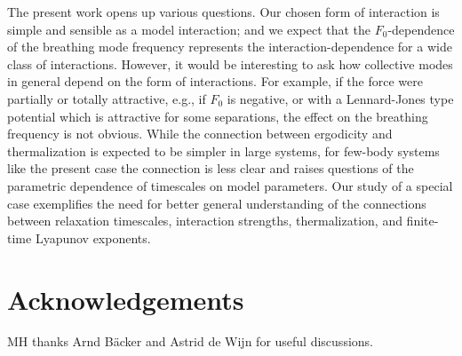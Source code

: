 \documentclass[a4paper, onecolumn]{revtex4-1}
\begin{document}
The present work opens up various questions.  Our chosen form of interaction is simple and sensible
as a model interaction; and we expect that the $F_0$-dependence of the breathing mode frequency
represents the interaction-dependence for a wide class of interactions.  However, it would be
interesting to ask how collective modes in general depend on the form of interactions.  For example,
if the force were partially or totally attractive, e.g., if $F_0$ is negative, or with a
Lennard-Jones type potential which is attractive for some separations, the effect on the breathing
frequency is not obvious.
%
While the connection between ergodicity and thermalization is expected to be simpler in large
systems, for few-body systems like the present case the connection is less clear and raises
questions of the parametric dependence of timescales on model parameters.  Our study of a special
case exemplifies the need for better general understanding of the connections between relaxation
timescales, interaction strengths, thermalization, and finite-time Lyapunov exponents.




\section*{Acknowledgements}

MH thanks Arnd B\"acker and Astrid de Wijn for useful discussions.
\end{document}
